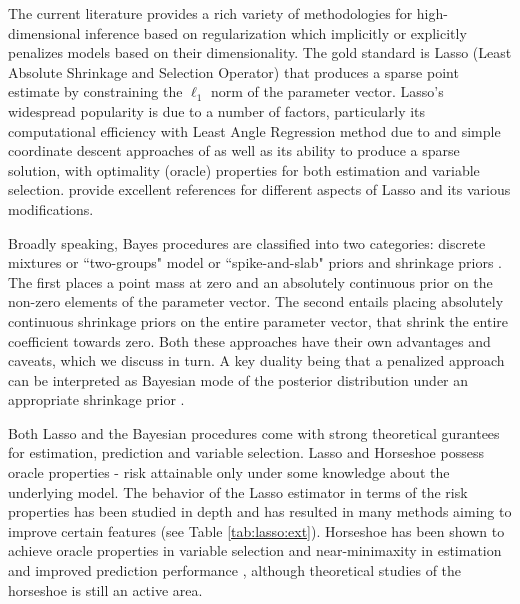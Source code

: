 \documentclass[11pt]{article}
\begin{document}
The current literature provides a rich variety of methodologies for high-dimensional inference based on regularization which implicitly or explicitly penalizes models based on their dimensionality. The gold standard is Lasso (Least Absolute Shrinkage and Selection Operator) that produces a sparse point estimate by constraining the $\ell_1$ norm of the parameter vector. Lasso's widespread popularity is due to a number of factors, particularly its computational efficiency with Least Angle Regression method due to \cite{efron_least_2004} and simple coordinate descent approaches of \citet{friedman_pathwise_2007} as well as its ability to produce a sparse solution, with optimality (oracle) properties for both estimation and variable selection. \cite{buhlmann2011statistics, james2013introduction, hastie2015statistical} provide excellent references for different aspects of Lasso and its various modifications. \par 


Broadly speaking, Bayes procedures are classified into two categories: discrete mixtures or ``two-groups" model or ``spike-and-slab" priors \citep{johnstone2004needles,efron2010large,efron2008microarrays,bogdan2011asymptotic} and shrinkage priors \citep{armagan2011generalized,armagan2013generalized,carvalho2009handling,carvalho2010horseshoe,griffin2005alternative,polson2010shrink,castillo2012needles}. The first places a point mass at zero and an absolutely continuous prior on the non-zero elements of the parameter vector.  The second entails placing absolutely continuous shrinkage priors on the entire parameter vector, that shrink the entire coefficient towards zero. Both these approaches have their own advantages and caveats, which we discuss in turn.  A key duality being that a penalized approach can be interpreted as Bayesian mode of the posterior distribution under an appropriate shrinkage prior \citep{polson2015mixtures}. 

Both Lasso and the Bayesian procedures come with strong theoretical gurantees for estimation, prediction and variable selection. Lasso and Horseshoe possess oracle properties - risk attainable only under some knowledge about the underlying model. The behavior of the Lasso estimator in terms of the risk properties has been studied in depth and has resulted in many methods aiming to improve certain features (see Table \ref{tab:lasso:ext}). Horseshoe has been shown to achieve oracle properties in variable selection \citep{datta2013asymptotic} and near-minimaxity in estimation \citep{van2017adaptive} and improved prediction performance \citep{bhadra2016prediction}, although theoretical studies of the horseshoe is still an active area. 
\end{document}
